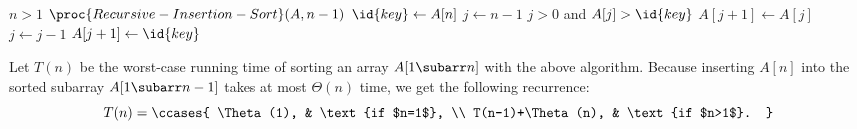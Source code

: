 \begin{codebox}
\li \If $n>1$
\li     \Then $\proc{Recursive-Insertion-Sort}(A,n-1)$
        \End
\li $\id{key}\gets A[n]$
\li $j\gets n-1$
\li \While $j>0$ and $A[j]>\id{key}$
\li     \Do $A[j+1]\gets A[j]$
\li         $j\gets j-1$
        \End
\li $A[j+1]\gets\id{key}$
\end{codebox}

Let $T(n)$ be the worst-case running time of sorting an array $A[1\subarr n]$ with the above algorithm.
Because inserting $A[n]$ into the sorted subarray $A[1\subarr n-1]$ takes at most $\Theta(n)$ time, we get the following recurrence:
\[
    T(n) =
    \ccases{
        \Theta(1), & \text{if $n=1$}, \\
        T(n-1)+\Theta(n), & \text{if $n>1$}.
    }
\]
